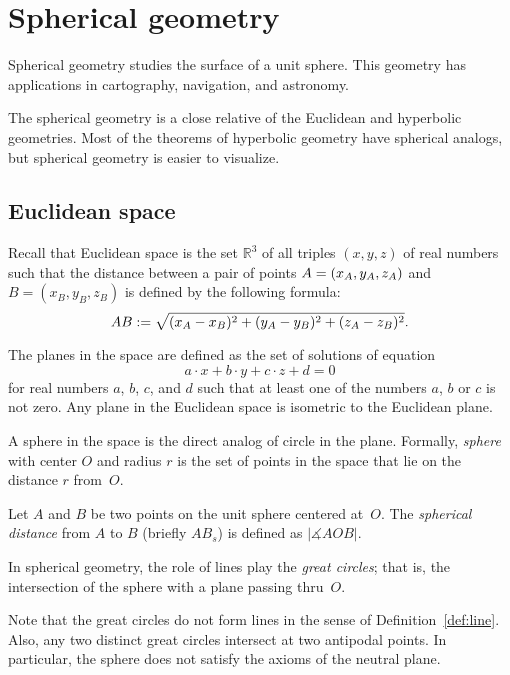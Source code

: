 \chapter{Spherical geometry}
\label{chap:sphere}

Spherical geometry studies the surface of a unit sphere.
This geometry has applications in cartography, navigation, and astronomy.

The spherical geometry is a close relative of the Euclidean and hyperbolic geometries.
Most of the theorems of hyperbolic geometry have spherical analogs,
but spherical geometry is easier to visualize. 

\section*{Euclidean space}

Recall that Euclidean space is the set $\mathbb{R}^3$ of all triples $(x,y,z)$ of real numbers
such that the distance between a pair of points
$A\z=(x_A,y_A,z_A)$ and $B=(x_B,y_B,z_B)$
is defined by the following formula:
$$AB
:=
\sqrt{(x_A-x_B)^2+(y_A-y_B)^2+(z_A-z_B)^2}.$$

The planes in the space are defined as the set of solutions of equation 
$$a\cdot x+b\cdot y+c\cdot z+d=0$$ 
for real numbers $a$, $b$, $c$, and $d$ such that at least one of the numbers $a$, $b$ or $c$ is not zero.
Any plane in the Euclidean space is isometric to the Euclidean plane.

A sphere in the space is the direct analog of circle in the plane.
Formally, \emph{sphere} with center $O$ and radius $r$ is the set of points in the space that lie on the distance $r$ from~$O$.

Let $A$ and $B$ be two points on the unit sphere centered at~$O$.
The \emph{spherical distance} from $A$ to $B$
(briefly $AB_s$)
 is defined as  $|\measuredangle AOB|$. 

In spherical geometry, the role of lines play the \emph{great circles};
that is, the intersection of the sphere with a plane passing thru~$O$.

Note that the great circles do not form lines in the sense of Definition~\ref{def:line}.
Also, any two distinct great circles intersect at two antipodal points.
In particular, the sphere does not satisfy the axioms of the neutral plane.







